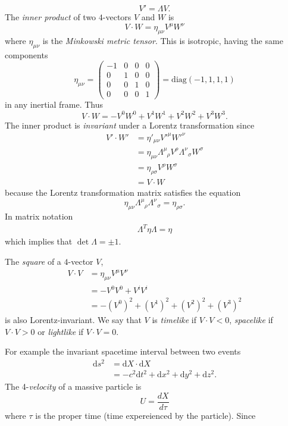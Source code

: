 \documentclass{article}
\newcommand{\glg}{\phantom{\mu}}
\begin{document}
\[
  V' = \Lambda V.
\]
The \textit{inner product} of two $ 4 $-vectors $ V $ and $ W $ is
\[
	V\cdot W = \eta_{\mu\nu} V^{\mu}W^{\nu}
\]
where $ \eta_{\mu\nu} $ is the \textit{Minkowski metric tensor}. This is isotropic, having the same components
\[
	\eta_{\mu\nu} = \begin{pmatrix}
		-1 & 0 & 0 & 0 \\
		0 & 1 & 0 & 0 \\
		0 & 0 & 1 & 0 \\
		0 & 0 & 0 & 1
	\end{pmatrix}=\mathrm{diag}(-1,1,1,1)
\]
in any inertial frame. Thus
\[
  V\cdot W = -V^0W^0 + V^1W^1 + V^2W^2 +V^3W^3.
\]
The inner product is \textit{invariant} under a Lorentz transformation since
\begin{align*}
	V'\cdot W' &= \eta'_{\mu\nu}V'^\mu W'^\nu \\
		   &= \eta_{\mu\nu}\Lambda^\mu_{\glg \rho}V^{\rho}\Lambda^\nu_{\glg \sigma}W^\sigma\\
		   &= \eta_{\rho \sigma} V^\rho W^\sigma \\
		   &= V\cdot W
\end{align*}
because the Lorentz transformation matrix satisfies the equation
\[
	\eta_{\mu\nu} \Lambda^\mu_{\glg \rho} \Lambda^{\nu}_{\glg \sigma} = \eta_{\rho \sigma}.
\]
In matrix notation
\begin{align*}
  \Lambda^T \eta \Lambda = \eta
\end{align*}
which implies that $ \det\Lambda = \pm 1 $.\par
The \textit{square} of a $ 4 $-vector $ V $,
\begin{align*}
	V\cdot V &= \eta_{\mu\nu} V^\mu V^\nu \\
		 &= - V^0 V^0 + V^i V^i \\
		 &= -(V^0)^2 + (V^1)^2 + (V^2)^2 + (V^3)^2
\end{align*}
is also Lorentz-invariant. We say that $ V $ is \textit{timelike} if $ V\cdot V<0 $, \textit{spacelike} if $ V\cdot V > 0 $ or \textit{lightlike} if $ V\cdot V = 0 $.
\par
For example the invariant spacetime interval between two events
\begin{align*}
	\mathrm ds^2 &= \mathrm dX\cdot \mathrm dX \\
		     &= -c^2\mathrm dt^2 + \mathrm dx^2 + \mathrm dy^2 + \mathrm dz^2.
\end{align*}
The 4-\textit{velocity} of a massive particle is
\[
	U = \frac{dX}{d\tau}
\]
where $ \tau $ is the proper time (time expereienced by the particle). Since
\end{document}
